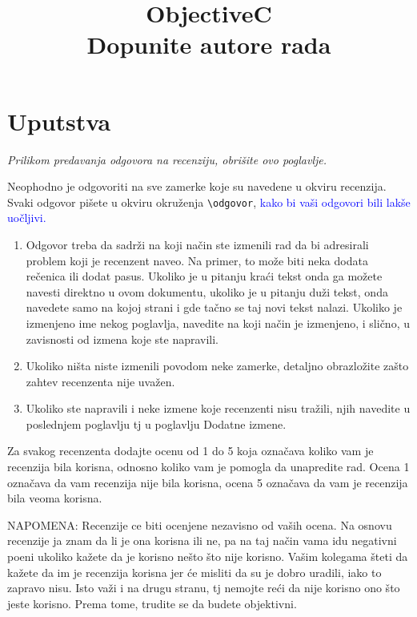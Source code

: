 \documentclass[a4paper]{report}
\newcommand{\odgovor}[1]{\textcolor{blue}{#1}}
\begin{document}
\title{ObjectiveC\\ \small{Dopunite autore rada}}

\maketitle

\tableofcontents

\chapter{Uputstva}
\emph{Prilikom predavanja odgovora na recenziju, obrišite ovo poglavlje.}

Neophodno je odgovoriti na sve zamerke koje su navedene u okviru recenzija. Svaki odgovor pišete u okviru okruženja \verb"\odgovor", \odgovor{kako bi vaši odgovori bili lakše uočljivi.} 
\begin{enumerate}

\item Odgovor treba da sadrži na koji način ste izmenili rad da bi adresirali problem koji je recenzent naveo. Na primer, to može biti neka dodata rečenica ili dodat pasus. Ukoliko je u pitanju kraći tekst onda ga možete navesti direktno u ovom dokumentu, ukoliko je u pitanju duži tekst, onda navedete samo na kojoj strani i gde tačno se taj novi tekst nalazi. Ukoliko je izmenjeno ime nekog poglavlja, navedite na koji način je izmenjeno, i slično, u zavisnosti od izmena koje ste napravili. 

\item Ukoliko ništa niste izmenili povodom neke zamerke, detaljno obrazložite zašto zahtev recenzenta nije uvažen.

\item Ukoliko ste napravili i neke izmene koje recenzenti nisu tražili, njih navedite u poslednjem poglavlju tj u poglavlju Dodatne izmene.
\end{enumerate}

Za svakog recenzenta dodajte ocenu od 1 do 5 koja označava koliko vam je recenzija bila korisna, odnosno koliko vam je pomogla da unapredite rad. Ocena 1 označava da vam recenzija nije bila korisna, ocena 5 označava da vam je recenzija bila veoma korisna. 

NAPOMENA: Recenzije ce biti ocenjene nezavisno od vaših ocena. Na osnovu recenzije ja znam da li je ona korisna ili ne, pa na taj način vama idu negativni poeni ukoliko kažete da je korisno nešto što nije korisno. Vašim kolegama šteti da kažete da im je recenzija korisna jer će misliti da su je dobro uradili, iako to zapravo nisu. Isto važi i na drugu stranu, tj nemojte reći da nije korisno ono što jeste korisno. Prema tome, trudite se da budete objektivni. 
\end{document}
